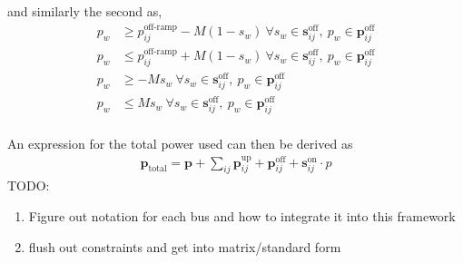 and similarly the second as, 
\begin{equation} \begin{aligned}
	p_w &\ge p^{\text{off-ramp}}_{ij} - M(1 - s_w) \ \forall s_w \in \mathbf{s}^{\text{off}}_{ij}, \ p_w \in \mathbf{p}_{ij}^{\text{off}}\\
		p_w &\le p^{\text{off-ramp}}_{ij} + M(1 - s_w) \ \forall s_w \in \mathbf{s}^{\text{off}}_{ij}, \ p_w \in \mathbf{p}_{ij}^{\text{off}}\\
		p_w &\ge -Ms_w \ \forall s_w \in \mathbf{s}^{\text{off}}_{ij}, \ p_w \in \mathbf{p}_{ij}^{\text{off}}\\
		p_w &\le Ms_w \ \forall s_w \in \mathbf{s}^{\text{off}}_{ij}, \ p_w \in \mathbf{p}_{ij}^{\text{off}}\\
\end{aligned} \end{equation} 

An expression for the total power used can then be derived as
\begin{equation}
	\begin{aligned}
		\mathbf{p}_{\text{total}} = \mathbf{p} + \sum_{ij} \mathbf{p}^{\text{up}}_{ij} + \mathbf{p}^{\text{off}}_{ij} + \mathbf{s}^{\text{on}}_{ij}\cdot p
	\end{aligned}
\end{equation}
TODO: 
\begin{enumerate}
	\item Figure out notation for each bus and how to integrate it into this framework
	\item flush out constraints and get into matrix/standard form
\end{enumerate}
